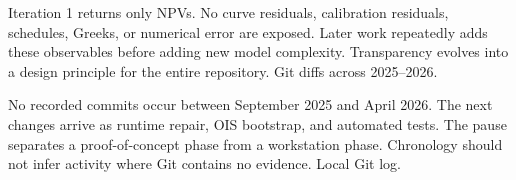{Iteration 1 returns only NPVs.}
{No curve residuals, calibration residuals, schedules, Greeks, or numerical error are exposed.}
{Later work repeatedly adds these observables before adding new model complexity.}
{Transparency evolves into a design principle for the entire repository.}
{Git diffs across 2025--2026.}

{No recorded commits occur between September 2025 and April 2026.}
{The next changes arrive as runtime repair, OIS bootstrap, and automated tests.}
{The pause separates a proof-of-concept phase from a workstation phase.}
{Chronology should not infer activity where Git contains no evidence.}
{Local Git log.}
